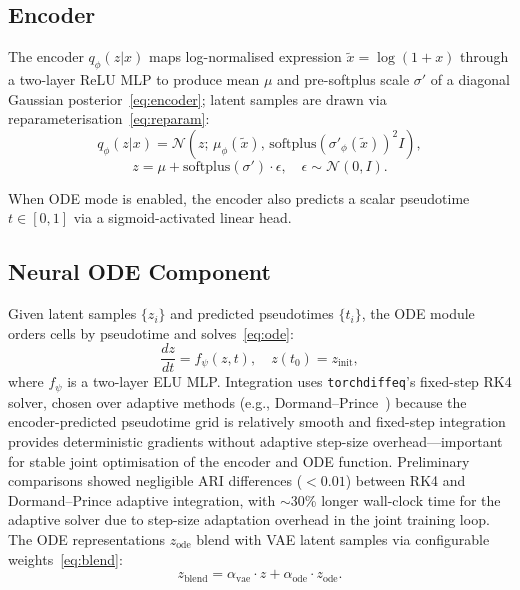 \documentclass[biology,article,submit,pdftex]{Definitions/mdpi}
\begin{document}
\subsection{Encoder}
\label{sec:method:encoder}

The encoder $q_\phi(z|x)$ maps log-normalised expression $\tilde{x} = \log(1 + x)$ through a two-layer ReLU MLP to produce mean $\mu$ and pre-softplus scale $\sigma'$ of a diagonal Gaussian posterior~\eqref{eq:encoder}; latent samples are drawn via reparameterisation~\eqref{eq:reparam}:
\begin{equation}
    q_\phi(z|x) = \mathcal{N}\!\left(z;\, \mu_\phi(\tilde{x}),\, \mathrm{softplus}(\sigma'_\phi(\tilde{x}))^2 I\right),
    \label{eq:encoder}
\end{equation}
\begin{equation}
    z = \mu + \mathrm{softplus}(\sigma') \cdot \epsilon, \quad \epsilon \sim \mathcal{N}(0, I).
    \label{eq:reparam}
\end{equation}

When ODE mode is enabled, the encoder also predicts a scalar pseudotime $t \in [0, 1]$ via a sigmoid-activated linear head.

\subsection{Neural ODE Component}
\label{sec:method:ode}

Given latent samples $\{z_i\}$ and predicted pseudotimes $\{t_i\}$, the ODE module orders cells by pseudotime and solves~\eqref{eq:ode}:
\begin{equation}
    \frac{dz}{dt} = f_\psi(z, t), \quad z(t_0) = z_{\mathrm{init}},
    \label{eq:ode}
\end{equation}
where $f_\psi$ is a two-layer ELU MLP. Integration uses \texttt{torchdiffeq}'s fixed-step RK4 solver, chosen over adaptive methods (e.g., Dormand--Prince~\cite{dormand1980rk}) because the encoder-predicted pseudotime grid is relatively smooth and fixed-step integration provides deterministic gradients without adaptive step-size overhead---important for stable joint optimisation of the encoder and ODE function. Preliminary comparisons showed negligible ARI differences ($<0.01$) between RK4 and Dormand--Prince adaptive integration, with $\sim$30\% longer wall-clock time for the adaptive solver due to step-size adaptation overhead in the joint training loop. The ODE representations $z_{\mathrm{ode}}$ blend with VAE latent samples via configurable weights~\eqref{eq:blend}:
\begin{equation}
    z_{\mathrm{blend}} = \alpha_{\mathrm{vae}} \cdot z + \alpha_{\mathrm{ode}} \cdot z_{\mathrm{ode}}.
    \label{eq:blend}
\end{equation}
\end{document}
